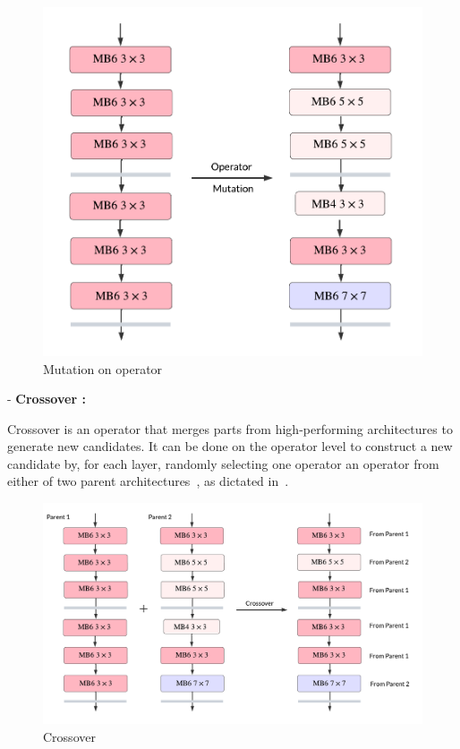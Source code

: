                     \begin{figure}[hbt!]
                        \begin{center}
                        \includegraphics[width=.6\textwidth]{assets/images/mutop.png}
                        \end{center}
                        \caption{Mutation on operator}%
                        \label{fig:hw-nas:nas:mutop}
                    \end{figure}
                    

                - \textbf{Crossover :}
                
                Crossover is an operator that merges parts from high-performing architectures to generate new candidates. It can be done on the operator level to construct a new candidate by, for each layer, randomly selecting one operator an operator from either of two parent architectures~\cite{onceforall}, as dictated in~.

                \begin{figure}[hbt!]
                        \begin{center}
                        \includegraphics[width=.8\textwidth]{assets/images/crossover.png}
                        \end{center}
                        \caption{Crossover}%
                        \label{fig:hw-nas:nas:crossover}
                    \end{figure}

